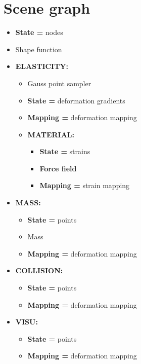 \newpage
\section{Scene graph}

\begin{itemize}
 \item \textbf{State =} nodes
 \item Shape function

 \item \textbf{ELASTICITY:}
  \begin{itemize}
  \item Gauss point sampler
  \item \textbf{State =} deformation gradients
  \item \textbf{Mapping =} deformation mapping

  \item \textbf{MATERIAL:}
    \begin{itemize}
    \item \textbf{State =} strains
    \item \textbf{Force field}
    \item \textbf{Mapping =} strain mapping
    \end{itemize}
  \end{itemize}

 \item \textbf{MASS:}
    \begin{itemize}
    \item \textbf{State =} points 
    \item Mass
    \item \textbf{Mapping =} deformation mapping
    \end{itemize}
 \item \textbf{COLLISION:}
    \begin{itemize}
    \item \textbf{State =} points 
    \item \textbf{Mapping =} deformation mapping
    \end{itemize}
 \item \textbf{VISU:}
    \begin{itemize}
    \item \textbf{State =} points 
    \item \textbf{Mapping =} deformation mapping
    \end{itemize}

\end{itemize}


